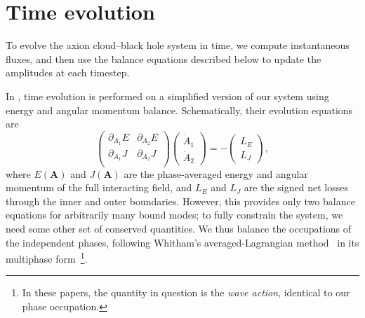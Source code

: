 \documentclass[11pt]{article}
\newcommand{\ON}[1]{ \textcolor{violet}{(ON: #1)} }
\begin{document}
\section{Time evolution}
\label{sec:evolution}
To evolve the axion cloud--black hole system in time, we compute instantaneous fluxes, and then use the balance equations described below to update the amplitudes at each timestep.


In \cite{Omiya_2023}, time evolution is performed on a simplified version of our system using energy and angular momentum balance. Schematically, their evolution equations are
\begin{equation}
    \begin{pmatrix}
    \partial_{A_1} E & \partial_{A_2} E \\
    \partial_{A_1} J & \partial_{A_2} J \\
    \end{pmatrix}
    \begin{pmatrix}
    \dot{A}_1 \\ \dot{A}_2
    \end{pmatrix} = -\begin{pmatrix}
        L_E \\ L_J
    \end{pmatrix},
\end{equation}
where $E(\mathbf{A})$ and $J(\mathbf{A})$ are the phase-averaged energy and angular momentum of the full interacting field, and $L_E$ and $L_J$ are the signed net losses through the inner and outer boundaries. However, this provides only two balance equations for arbitrarily many bound modes; to fully constrain the system, we need some other set of conserved quantities. We thus balance the occupations of the independent phases, following Whitham's averaged-Lagrangian method~\cite{Whitham_1965} in its multiphase form~\cite{Ablowitz_1970}\footnote{In these papers, the quantity in question is the \textit{wave action}, identical to our phase occupation.}.
\end{document}
